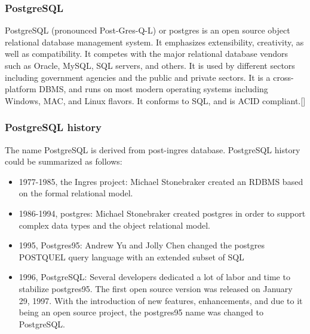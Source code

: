\subsubsection*{PostgreSQL}
PostgreSQL (pronounced Post-Gres-Q-L) or postgres is an open source object relational database management system. It emphasizes extensibility, creativity, as well as compatibility. It competes with the major relational database vendors such as Oracle, MySQL, SQL servers, and others. It is used by different sectors including government agencies and the public and private sectors. It is a cross-platform DBMS, and runs on most modern operating systems including Windows, MAC, and Linux flavors. It conforms to SQL, and is ACID compliant.[\cite{14}]

\subsubsection*{PostgreSQL history}
The name PostgreSQL is derived from post-ingres database. PostgreSQL history could be summarized as follows:
\begin{itemize}
	\item 1977-1985, the Ingres project: Michael Stonebraker created an RDBMS based on the formal relational model.
	\item 1986-1994, postgres: Michael Stonebraker created postgres in order to support complex data types and the object relational model.
	\item 1995, Postgres95: Andrew Yu and Jolly Chen changed the postgres POSTQUEL query language with an extended subset of SQL
	\item 1996, PostgreSQL: Several developers dedicated a lot of labor and time to stabilize postgres95. The first open source version was released on January 29, 1997. With the introduction of new features, enhancements, and due to it being an open source project, the postgres95 name was changed to PostgreSQL.
\end{itemize}


